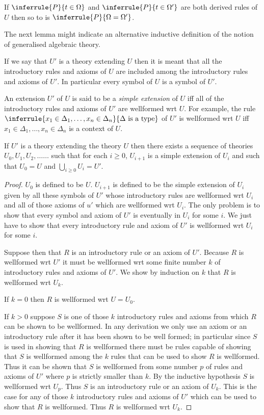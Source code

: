 \begin{corollary} 
If $\inferrule{P}{t\in\Omega}$ and $\inferrule{P}{t\in\Omega'}$ are both derived rules of $U$ then so to is $\inferrule{P}{\Omega=\Omega'}$.
\end{corollary}

The next lemma might indicate an alternative inductive definition of the notion of generalised algebraic theory.

If we say that $U'$ is a theory extending $U$ then it is meant that all the introductory rules and axioms of $U$ are included among the introductory rules and axioms of $U'$.
%
In particular every symbol of $U$ is a symbol of $U'$.

An extension $U'$ of $U$ is said to be a \emph{simple extension} of $U$ iff all of the introductory rules and axioms of $U'$ are wellformed wrt $U$.
%
For example, the rule $\inferrule{x_1\in\Delta_1,\ldots,x_n\in\Delta_n}{\Delta\isatype}$ of $U'$ is wellformed wrt $U$ iff $x_1\in\Delta_1,\ldots,x_n\in\Delta_n$ is a context of $U$.

\begin{lemma}[3]
If $U'$ is a theory extending the theory $U$ then there exists a sequence of theories $U_0, U_1, U_2,\ldots\ldots$ such that for each $i\geq 0$, $U_{i+1}$ is a simple extension of $U_i$ and such that $U_0=U$ and $\bigcup_{i\geq 0} U_i= U'$.
\end{lemma}

\begin{proof}
  $U_0$ is defined to be $U$.
  $U_{i+1}$ is defined to be the simple extension of $U_i$ given by all these symbols of $U'$ whose introductory rules are wellformed wrt $U_i$ and all of those axioms of $u'$ which are wellformed wrt $U_i$.
  The only problem is to show that every symbol and axiom of $U'$ is eventually in $U_i$ for some $i$.
  We just have to show that every introductory rule and axiom of $U'$ is wellformed wrt $U_i$ for some $i$.

  Suppose then that $R$ is an introductory rule or an axiom of $U'$.
  Because $R$ is wellformed wrt $U'$ it must be wellformed wrt some finite number $k$ of introductory rules and axioms of $U'$.
  We show by induction on $k$ that $R$ is wellformed wrt $U_k$.


  If $k=0$ then $R$ is wellformed wrt $U=U_0$.


  If $k>0$ suppose $S$ is one of those $k$ introductory rules and axioms from which $R$ can be shown to be wellformed.
  In any derivation we only use an axiom or an introductory rule after it has been shown to be well formed; in particular since $S$ is used in showing that $R$ is wellformed there must be rules capable of showing that $S$ is wellformed among the $k$ rules that can be used to show $R$ is wellformed.
  Thus it can be shown that $S$ is wellformed from some number $p$ of rules and axioms of $U'$ where $p$ is strictly smaller than $k$. By the inductive hypothesis $S$ is wellformed wrt $U_p$.
  Thus $S$ is an introductory rule or an axiom of $U_k$.
  This is the case for any of those $k$ introductory rules and axioms of $U'$ which can be used to show that $R$ is wellformed.
  Thus $R$ is wellformed wrt $U_k$.
\end{proof}


